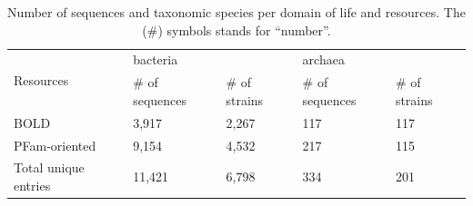 \begin{table}[]
   \begin{tabular}{lllll}
   \hline
   \multicolumn{1}{|l|}{\multirow{2}{*}{Resources}} & \multicolumn{2}{l|}{bacteria}                                             & \multicolumn{2}{l|}{archaea}                                              \\ \cline{2-5} 
   \multicolumn{1}{|l|}{}                           & \multicolumn{1}{l|}{\# of sequences} & \multicolumn{1}{l|}{\# of strains} & \multicolumn{1}{l|}{\# of sequences} & \multicolumn{1}{l|}{\# of strains} \\ \hline
   BOLD                                             & 3,917                                & 2,267                              & 117                                  & 117                                \\
   PFam-oriented                                    & 9,154                                & 4,532                              & 217                                  & 115                                \\ \hline
   \multicolumn{1}{|l|}{Total unique entries}       & \multicolumn{1}{l|}{11,421}          & \multicolumn{1}{l|}{6,798}         & \multicolumn{1}{l|}{334}             & \multicolumn{1}{l|}{201}           \\ \hline
   \end{tabular}
   \caption{Number of sequences and taxonomic species per domain of life and resources. The (\#) symbols stands for “number”.}
   \label{tab:sequences_per_domain}
\end{table}


